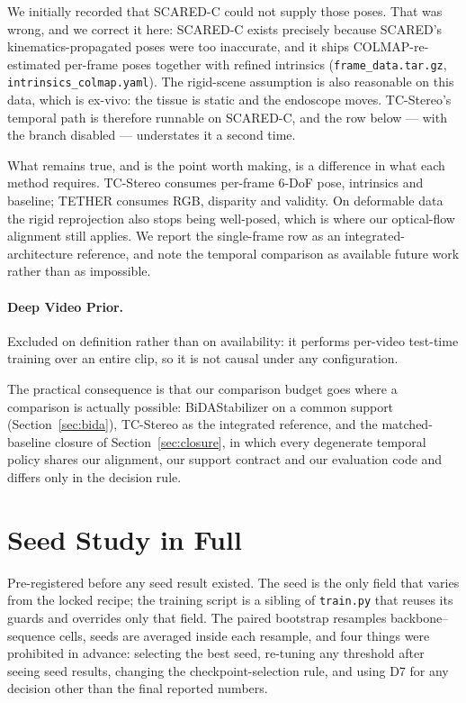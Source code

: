\documentclass[letterpaper,10pt,conference]{ieeeconf}
\begin{document}
We initially recorded that SCARED-C could not supply those poses. That
was wrong, and we correct it here: SCARED-C exists precisely because
SCARED's kinematics-propagated poses were too inaccurate, and it ships
COLMAP-re-estimated per-frame poses together with refined intrinsics
(\texttt{frame\_data.tar.gz}, \texttt{intrinsics\_colmap.yaml}). The
rigid-scene assumption is also reasonable on this data, which is ex-vivo:
the tissue is static and the endoscope moves. TC-Stereo's temporal path
is therefore runnable on SCARED-C, and the row below --- with the branch
disabled --- understates it a second time.

What remains true, and is the point worth making, is a difference in what
each method requires. TC-Stereo consumes per-frame $6$-DoF pose,
intrinsics and baseline; TETHER consumes RGB, disparity and validity. On
deformable data the rigid reprojection also stops being well-posed, which
is where our optical-flow alignment still applies. We report the
single-frame row as an integrated-architecture reference, and note the
temporal comparison as available future work rather than as impossible.

\paragraph{Deep Video Prior.} Excluded on definition rather than on
availability: it performs per-video test-time training over an entire
clip, so it is not causal under any configuration.

The practical consequence is that our comparison budget goes where a
comparison is actually possible: BiDAStabilizer on a common support
(Section~\ref{sec:bida}), TC-Stereo as the integrated reference, and the
matched-baseline closure of Section~\ref{sec:closure}, in which every
degenerate temporal policy shares our alignment, our support contract and
our evaluation code and differs only in the decision rule.

\section{Seed Study in Full}

Pre-registered before any seed result existed. The seed is the only field
that varies from the locked recipe; the training script is a sibling of
\texttt{train.py} that reuses its guards and overrides only that field.
The paired bootstrap resamples backbone--sequence cells, seeds are averaged
inside each resample, and four things were prohibited in advance:
selecting the best seed, re-tuning any threshold after seeing seed
results, changing the checkpoint-selection rule, and using D7 for any
decision other than the final reported numbers.
\end{document}
